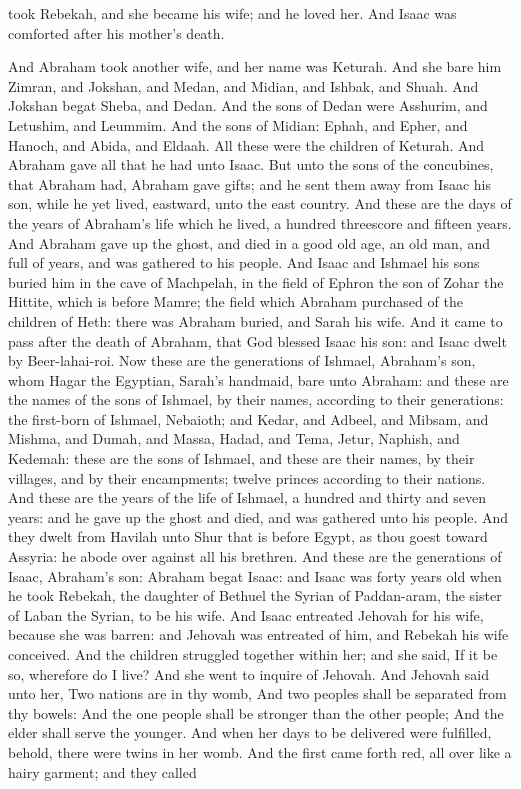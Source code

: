 took Rebekah, and she became his wife; and he loved her. And Isaac was comforted after his mother’s death. 

And Abraham took another wife, and her name was Keturah. And she bare him Zimran, and Jokshan, and Medan, and Midian, and Ishbak, and Shuah. And Jokshan begat Sheba, and Dedan. And the sons of Dedan were Asshurim, and Letushim, and Leummim. And the sons of Midian: Ephah, and Epher, and Hanoch, and Abida, and Eldaah. All these were the children of Keturah. And Abraham gave all that he had unto Isaac. But unto the sons of the concubines, that Abraham had, Abraham gave gifts; and he sent them away from Isaac his son, while he yet lived, eastward, unto the east country. And these are the days of the years of Abraham’s life which he lived, a hundred threescore and fifteen years. And Abraham gave up the ghost, and died in a good old age, an old man, and full of years, and was gathered to his people. And Isaac and Ishmael his sons buried him in the cave of Machpelah, in the field of Ephron the son of Zohar the Hittite, which is before Mamre; the field which Abraham purchased of the children of Heth: there was Abraham buried, and Sarah his wife. And it came to pass after the death of Abraham, that God blessed Isaac his son: and Isaac dwelt by Beer-lahai-roi.  Now these are the generations of Ishmael, Abraham’s son, whom Hagar the Egyptian, Sarah’s handmaid, bare unto Abraham: and these are the names of the sons of Ishmael, by their names, according to their generations: the first-born of Ishmael, Nebaioth; and Kedar, and Adbeel, and Mibsam, and Mishma, and Dumah, and Massa, Hadad, and Tema, Jetur, Naphish, and Kedemah: these are the sons of Ishmael, and these are their names, by their villages, and by their encampments; twelve princes according to their nations. And these are the years of the life of Ishmael, a hundred and thirty and seven years: and he gave up the ghost and died, and was gathered unto his people. And they dwelt from Havilah unto Shur that is before Egypt, as thou goest toward Assyria: he abode over against all his brethren.  And these are the generations of Isaac, Abraham’s son: Abraham begat Isaac: and Isaac was forty years old when he took Rebekah, the daughter of Bethuel the Syrian of Paddan-aram, the sister of Laban the Syrian, to be his wife. And Isaac entreated Jehovah for his wife, because she was barren: and Jehovah was entreated of him, and Rebekah his wife conceived. And the children struggled together within her; and she said, If it be so, wherefore do I live? And she went to inquire of Jehovah. And Jehovah said unto her, Two nations are in thy womb, And two peoples shall be separated from thy bowels: And the one people shall be stronger than the other people; And the elder shall serve the younger.  And when her days to be delivered were fulfilled, behold, there were twins in her womb. And the first came forth red, all over like a hairy garment; and they called 